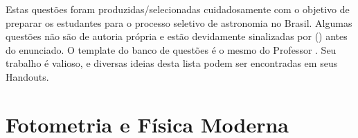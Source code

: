 \documentclass[11pt]{article}
\begin{document}

Estas questões foram produzidas/selecionadas cuidadosamente com o objetivo de preparar os estudantes para o processo seletivo de astronomia no Brasil. Algumas questões não são de autoria própria e estão devidamente sinalizadas por () antes do enunciado. O template do banco de questões é o mesmo do Professor . Seu trabalho é valioso, e diversas ideias desta lista podem ser encontradas em seus Handouts.




\section{Fotometria e Física Moderna}
\end{document}
